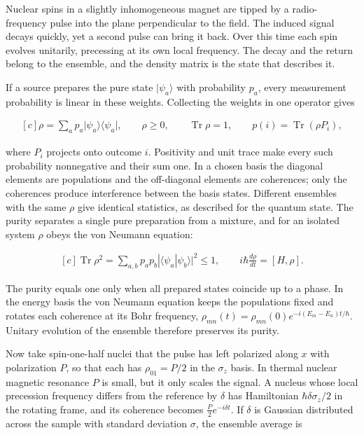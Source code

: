 \documentclass[11pt,oneside]{book}
\newenvironment{centeredalign}{\[\begin{gathered}[c]}{\end{gathered}\]}
\newcommand{\ket}[1]{\lvert #1\rangle}
\newcommand{\bra}[1]{\langle #1\rvert}
\begin{document}
Nuclear spins in a slightly inhomogeneous magnet are tipped by a radio-frequency pulse into the plane perpendicular to the field. The induced signal decays quickly, yet a second pulse can bring it back. Over this time each spin evolves unitarily, precessing at its own local frequency. The decay and the return belong to the ensemble, and the density matrix is the state that describes it.

If a source prepares the pure state \(\ket{\psi_a}\) with probability \(p_a\), every measurement probability is linear in these weights. Collecting the weights in one operator gives

\begin{centeredalign}
\rho=\sum_a p_a\ket{\psi_a}\bra{\psi_a},\qquad \rho\geq0,\qquad \operatorname{Tr}\rho=1,
\qquad p(i)=\operatorname{Tr}(\rho P_i),
\end{centeredalign}

where \(P_i\) projects onto outcome \(i\). Positivity and unit trace make every such probability nonnegative and their sum one. In a chosen basis the diagonal elements are populations and the off-diagonal elements are coherences; only the coherences produce interference between the basis states. Different ensembles with the same \(\rho\) give identical statistics, as described for the quantum state. The purity separates a single pure preparation from a mixture, and for an isolated system \(\rho\) obeys the von Neumann equation:

\begin{centeredalign}
\operatorname{Tr}\rho^2=\sum_{a,b}p_ap_b|\langle\psi_a|\psi_b\rangle|^2\leq1,
\qquad i\hbar\frac{d\rho}{dt}=[H,\rho].
\end{centeredalign}

The purity equals one only when all prepared states coincide up to a phase. In the energy basis the von Neumann equation keeps the populations fixed and rotates each coherence at its Bohr frequency, \(\rho_{mn}(t)=\rho_{mn}(0)e^{-i(E_m-E_n)t/\hbar}\). Unitary evolution of the ensemble therefore preserves its purity.

Now take spin-one-half nuclei that the pulse has left polarized along \(x\) with polarization \(P\), so that each has \(\rho_{01}=P/2\) in the \(\sigma_z\) basis. In thermal nuclear magnetic resonance \(P\) is small, but it only scales the signal. A nucleus whose local precession frequency differs from the reference by \(\delta\) has Hamiltonian \(\hbar\delta\sigma_z/2\) in the rotating frame, and its coherence becomes \(\tfrac P2e^{-i\delta t}\). If \(\delta\) is Gaussian distributed across the sample with standard deviation \(\sigma\), the ensemble average is
\end{document}
